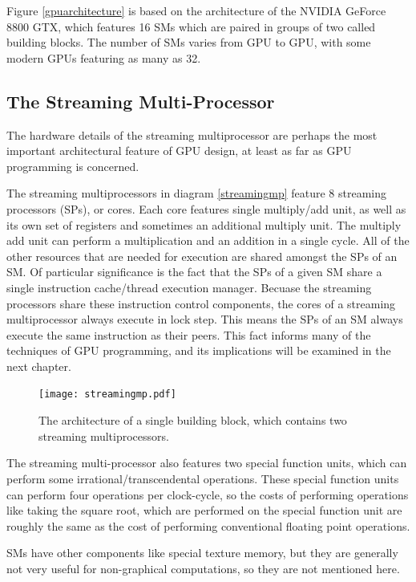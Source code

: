 \documentclass[12pt,twoside]{reedthesis}
\begin{document}
Figure \ref{gpuarchitecture} is based on the architecture of the NVIDIA GeForce 8800 GTX, which features 16 SMs which are paired in groups of two called building blocks. The number of SMs varies from GPU to GPU, with some modern GPUs featuring as many as 32.

\subsection{The Streaming Multi-Processor}
\label{smpsec}

The hardware details of the streaming multiprocessor are perhaps the most important architectural feature of GPU design, at least as far as GPU programming is concerned.

The streaming multiprocessors in diagram \ref{streamingmp} feature 8 streaming processors (SPs), or cores. Each core features single multiply/add unit, as well as its own set of registers and sometimes an additional multiply unit. The multiply add unit can perform a multiplication and an addition in a single cycle. All of the other resources that are needed for execution are shared amongst the SPs of an SM.
Of particular significance is the fact that the SPs of a given SM share a single instruction cache/thread execution manager. Becuase the streaming processors share these instruction control components, the cores of a streaming multiprocessor always execute in lock step. This means the SPs of an SM always execute the same instruction as their peers. This fact informs many of the techniques of GPU programming, and its implications will be examined in the next chapter.

\begin{figure}[h!]
\texttt{[image: streamingmp.pdf]}
\caption{The architecture of a single building block, which contains two streaming multiprocessors.}
\end{figure}
\label{streamingmp}
\vspace{1pc}

The streaming multi-processor also features two special function units, which can perform some irrational/transcendental operations. These special function units can perform four operations per clock-cycle, so the costs of performing operations like taking the square root, which are performed on the special function unit are roughly the same as the cost of performing conventional floating point operations.

SMs have other components like special texture memory, but they are generally not very useful for non-graphical computations, so they are not mentioned here.
\end{document}
